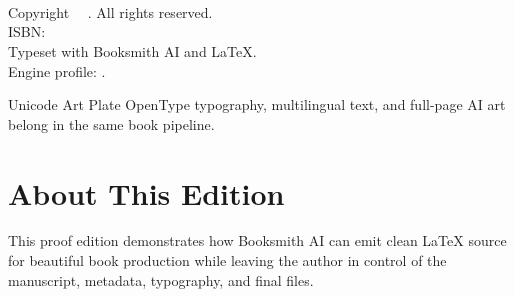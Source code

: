 \documentclass[11pt,openany]{book}
\begin{document}
\frontmatter
\thispagestyle{empty}
\begin{center}
  \vspace*{1.1in}
  {\DisplayFont\Huge\bfseries\color{BooksmithInk} \BookTitle\par}
  \vspace{0.25in}
  {\Large \BookSubtitle\par}
  \vfill
  {\Large \BookAuthor\par}
  \vspace{0.4in}
  {\small \BookPublisher\par}
\end{center}

\clearpage
\thispagestyle{empty}
\vspace*{\fill}
\noindent \BookTitle\\
\BookSubtitle\\
\BookEdition\\

\vspace{1em}
\noindent Copyright \textcopyright\ \BookCopyrightYear\ \BookAuthor. All rights reserved.\\
ISBN: \BookISBN\\

\vspace{1em}
\noindent Typeset with Booksmith AI and LaTeX.\\
Engine profile: \BooksmithFontEngine.
\clearpage

\tableofcontents

\mainmatter

\BooksmithPlaceholderPlate
  {Unicode Art Plate}
  {OpenType typography, multilingual text, and full-page AI art belong in the same book pipeline.}

\backmatter
\chapter*{About This Edition}
This proof edition demonstrates how Booksmith AI can emit clean LaTeX source for
beautiful book production while leaving the author in control of the manuscript,
metadata, typography, and final files.
\end{document}
